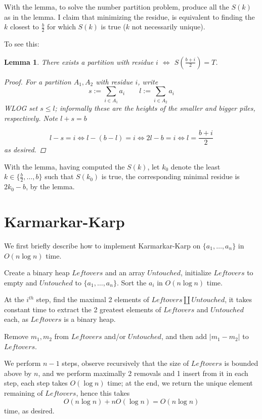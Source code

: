 \documentclass[final]{article}
\newtheorem{lemma}[theorem]{Lemma}
\begin{document}
With the lemma, to solve the number partition problem, produce all the $S(k)$ as in the lemma. I claim that minimizing the residue, is equivalent to finding the $k$ closest to $\frac{b}{2}$ for which $S(k)$ is true ($k$ not necessarily unique). 

To see this:

\begin{lemma} There exists a partition with residue $i$ $\Leftrightarrow$ $S(\frac{b+i}{2}) = T$. 

\begin{proof}
For a partition $A_1, A_2$ with residue $i$, write $$s := \sum_{i \in A_1} a_i \quad \quad l := \sum_{i \in A_2} a_i$$WLOG set $s \leqslant l$; informally these are the heights of the smaller and bigger piles, respectively. Note $l+s = b$

$$l - s = i \Leftrightarrow l - (b-l) = i \Leftrightarrow 2l - b = i \Leftrightarrow l = \frac{b+i}{2}$$as desired. 
\end{proof}

\end{lemma}

With the lemma, having computed the $S(k)$, let $k_0$ denote the least $k \in \{\frac{b}{2}, \ldots, b\}$ such that 
$S(k_0)$ is true, the corresponding minimal residue is $2k_0 - b$, by the lemma. 

\section{Karmarkar-Karp}
We first briefly describe how to implement Karmarkar-Karp on $\{a_1, \ldots, a_n\}$ in $O(n \log n)$ time. 

Create a binary heap $Leftovers$ and an array $Untouched$, initialize $Leftovers$ to empty and $Untouched$ to $\{a_1, \ldots, a_n\}$. Sort the $a_i$ in $O(n \log n)$ time.


At the $i^{th}$ step, find the maximal 2 elements of $Leftovers \coprod Untouched$, it takes constant time to extract the 2 greatest elements of $Leftovers$ and $Untouched$ each, as $Leftovers$ is a binary heap.

Remove $m_1, m_2$ from $Leftovers$ and/or $Untouched$, and then add $|m_1 - m_2|$ to $Leftovers$. 

We perform $n-1$ steps, observe recursively that the size of $Leftovers$ is bounded above by $n$, and we perform maximally 2 removals and 1 insert from it in each step, each step takes $O(\log n)$ time;  at the end, we return the unique element remaining of $Leftovers$, hence this takes $$O(n\log n) + nO(\log n) = O(n \log n)$$ time, as desired. 
\end{document}
